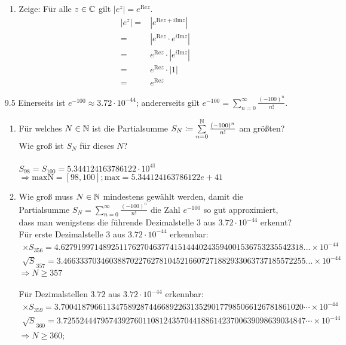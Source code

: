 \documentclass{HM}
\begin{document}
\begin{enumerate}
\begin{enumerate}
	\item Zeige: Für alle $z\in\mathbb{C}$ gilt $|e^z|=e^{\text{Re} z}$.
	\begin{align*}
		|e^z|
		=&|e^{\text{Re} z +i\text{Im} z}|\\
		=&|e^{\text{Re} z}\cdot e^{i\text{Im} z}|\\
		=&e^{\text{Re} z}\cdot |e^{i\text{Im} z}|\\
		=&e^{\text{Re} z}\cdot |1|\\
		=&e^{\text{Re} z}
	\end{align*}
\end{enumerate}
\item[9.5] Einerseits ist $e^{-100}\approx 3.72\cdot 10^{-44}$; andererseits gilt $e^{-100}=\sum\limits_{n=0}^\infty\frac{(-100)^n}{n!}$.
\begin{enumerate}
	\item Für welches $N\in\mathbb{N}$ ist die Partialsumme $S_N\coloneqq\sum\limits_{n=0}^{\mathbb{N}}\frac{(-100)^n}{n!}$ am größten? Wie groß ist $S_N$ für dieses $N$?\\\\
	 $S_{98}=S_{100}=5.344124163786122\cdot 10^{41}$\\
	
	$\Rightarrow\text{maxN} = [98, 100]; \text{max} = 5.344124163786122e+41$
	
	\item Wie groß muss $N\in\mathbb{N}$ mindestens gewählt werden, damit die Partialsumme $S_N=\sum\limits_{n=0}^\infty\frac{(-100)^n}{n!}$ die Zahl $e^{-100}$ so gut approximiert, dass man wenigstens die führende Dezimalstelle $3$ aus $3.72\cdot 10^{-44}$ erkennt?\\
Für erste Dezimalstelle $3$ aus $3.72\cdot 10^{-44}$ erkennbar:
\begin{align*}
	\times S_{356}=4.6279199714892511762704637741514440243594001536753235542318... \times 10^{-44}\\
	\surd S_{357}=3.4663337034603887022762781045216607271882933063737185572255... \times 10^{-44}
\end{align*}
$\Rightarrow N\geq357$\\\\
Für Dezimalstellen $3.72$ aus $3.72\cdot 10^{-44}$ erkennbar:
\begin{align*}
	\times S_{359}=3.7004187966113475892874466892263135290177985066126781861020\cdots\times 10^{-44}\\
	\surd S_{360}=3.7255244479574392760110812435704418861423700639098639034847\cdots \times 10^{-44}
\end{align*}
$\Rightarrow N\geq360$;
\end{enumerate}


\end{enumerate}
\end{document}
